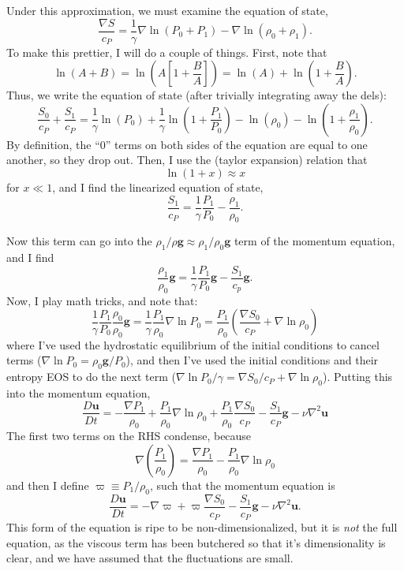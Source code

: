 \documentclass[aps, pre, onecolumn, nofootinbib, notitlepage, groupedaddress, amsfonts, amssymb, amsmath, longbibliography]{revtex4-1}
\newcommand{\grad}{\ensuremath{\nabla}}
\begin{document}
Under this approximation, we must examine the equation of state,
\begin{equation}
\frac{\grad S}{c_P} = \frac{1}{\gamma}\grad\ln(P_0 + P_1) - \grad \ln (\rho_0 + \rho_1).
\end{equation}
To make this prettier, I will do a couple of things.  First, note that
$$
\ln (A + B) = \ln\left(A\left[1 + \frac{B}{A}\right]\right) = \ln(A) + \ln\left(1 + \frac{B}{A}\right).
$$
Thus, we write the equation of state (after trivially integrating away the dels):
\begin{equation}
\frac{S_0}{c_P} + \frac{S_1}{c_P} = \frac{1}{\gamma}\ln(P_0) + \frac{1}{\gamma}\ln\left(1 + \frac{P_1}{P_0}\right)
- \ln(\rho_0) - \ln\left(1 + \frac{\rho_1}{\rho_0}\right).
\end{equation}
By definition, the ``0'' terms on both sides of the equation are equal to one another, so they
drop out.  Then, I use the (taylor expansion) relation that
$$
\ln(1 + x) \approx x
$$
for $x \ll 1$, and I find the linearized equation of state,
\begin{equation}
\boxed{
\frac{S_1}{c_P} = \frac{1}{\gamma} \frac{P_1}{P_0} - \frac{\rho_1}{\rho_0}
}.
\end{equation}

Now this term can go into the $\rho_1/\rho \bm{g} \approx \rho_1/\rho_0 \bm{g}$ term 
of the momentum equation, and I find
$$
\frac{\rho_1}{\rho_0}\bm{g} = \frac{1}{\gamma}\frac{P_1}{P_0}\bm{g} - \frac{S_1}{c_p}\bm{g}.
$$
Now, I play math tricks, and note that:
$$
\frac{1}{\gamma}\frac{P_1}{P_0}\frac{\rho_0}{\rho_0}\bm{g} = \frac{1}{\gamma}\frac{P_1}{\rho_0}\grad\ln P_0
= \frac{P_1}{\rho_0}\left(\frac{\grad S_0}{c_P} + \grad \ln \rho_0\right)
$$
where I've used the hydrostatic equilibrium of the initial conditions to cancel terms 
($\grad \ln P_0 = \rho_0 \bm{g} / P_0$), and then I've used the initial conditions
and their entropy EOS to do the next term ($\grad \ln P_0 / \gamma = \grad S_0 / c_P + \grad \ln \rho_0$).
Putting this into the momentum equation,
\begin{equation}
\frac{D\bm{u}}{Dt} = -\frac{\grad P_1}{\rho_0} + \frac{P_1}{\rho_0}\grad\ln\rho_0 + \frac{P_1}{\rho_0}\frac{\grad S_0}{c_P}
- \frac{S_1}{c_P}\bm{g} - \nu \grad^2\bm{u}
\end{equation}
The first two terms on the RHS condense, because
$$
\grad\left(\frac{P_1}{\rho_0}\right) = \frac{\grad P_1}{\rho_0} - \frac{P_1}{\rho_0}\grad\ln\rho_0
$$
and then I define $\varpi \equiv P_1/\rho_0$, such that the momentum equation is
\begin{equation}
\boxed{
\frac{D\bm{u}}{Dt} = -\grad \varpi + \varpi \frac{\grad S_0}{c_P} - \frac{S_1}{c_P}\bm{g} - \nu\grad^2\bm{u}.
}
\end{equation}
This form of the equation is ripe to be non-dimensionalized, but it is \emph{not} the full equation,
as the viscous term has been butchered so that it's dimensionality is clear, and we have assumed that
the fluctuations are small.
\end{document}

